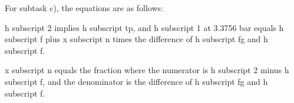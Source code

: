 For subtask c), the equations are as follows:

h subscript 2 implies h subscript tp, and h subscript 1 at 3.3756 bar equals h subscript f plus x subscript n times the difference of h subscript fg and h subscript f.

x subscript n equals the fraction where the numerator is h subscript 2 minus h subscript f, and the denominator is the difference of h subscript fg and h subscript f.